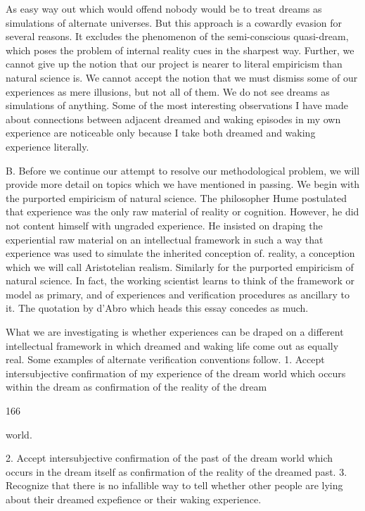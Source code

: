 \documentclass[10pt,twoside]{memoir}
\begin{document}
\begin{enumerate}
{\begin{enumerate}
\begin{sysrules}
\begin{sysrules}
\begin{sysrules}
\begin{sysrules}
{\begin{enumerate}
{{{{{{{As easy way out which would offend nobody would be to treat dreams 
as simulations of alternate universes. But this approach is a cowardly evasion 
for several reasons. It excludes the phenomenon of the semi-conscious 
quasi-dream, which poses the problem of internal reality cues in the sharpest 
way. Further, we cannot give up the notion that our project is nearer to 
literal empiricism than natural science is. We cannot accept the notion that 
we must dismiss some of our experiences as mere illusions, but not all of 
them. We do not see dreams as simulations of anything. Some of the most 
interesting observations I have made about connections between adjacent 
dreamed and waking episodes in my own experience are noticeable only 
because I take both dreamed and waking experience literally. 


B. Before we continue our attempt to resolve our methodological 
problem, we will provide more detail on topics which we have mentioned in 
passing. We begin with the purported empiricism of natural science. The 
philosopher Hume postulated that experience was the only raw material of 
reality or cognition. However, he did not content himself with ungraded 
experience. He insisted on draping the experiential raw material on an 
intellectual framework in such a way that experience was used to simulate 
the inherited conception of. reality, a conception which we will call 
Aristotelian realism. Similarly for the purported empiricism of natural 
science. In fact, the working scientist learns to think of the framework or 
model as primary, and of experiences and verification procedures as ancillary 
to it. The quotation by d'Abro which heads this essay concedes as much. 

What we are investigating is whether experiences can be draped on a 
different intellectual framework in which dreamed and waking life come out 
as equally real. Some examples of alternate verification conventions follow. 
1. Accept intersubjective confirmation of my experience of the dream world 
which occurs within the dream as confirmation of the reality of the dream 


166 


world. 

2. Accept intersubjective confirmation of the past of the dream world which 
occurs in the dream itself as confirmation of the reality of the dreamed past. 
3. Recognize that there is no infallible way to tell whether other people are 
lying about their dreamed expefience or their waking experience. 

}}}}}}}
\end{enumerate}}
\end{sysrules}
\end{sysrules}
\end{sysrules}
\end{sysrules}
\end{enumerate}}
\end{enumerate}
\end{document}
